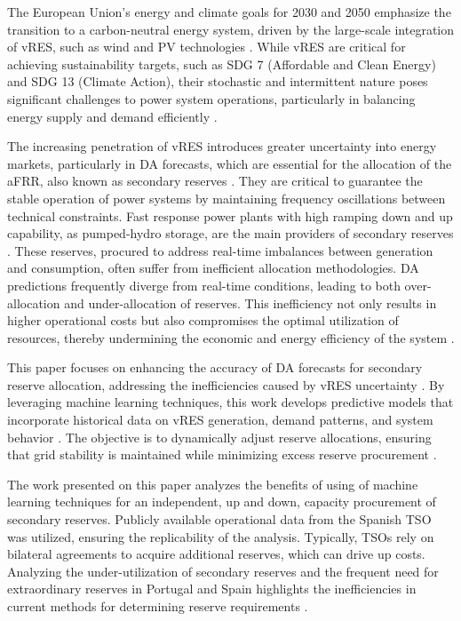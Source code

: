 The European Union's energy and climate goals for 2030 and 2050 emphasize the transition to a carbon-neutral energy system, driven by the large-scale integration of \gls{vRES}, such as wind and \gls{PV} technologies \cite{Franc:21,Perissi2022,Dobrowolski:22}. While \gls{vRES} are critical for achieving sustainability targets, such as \gls{SDG} 7 (Affordable and Clean Energy) and \gls{SDG} 13 (Climate Action), their stochastic and intermittent nature poses significant challenges to power system operations, particularly in balancing energy supply and demand efficiently \cite{Ocker2017,Frade2019_wind}.  \par
The increasing penetration of \gls{vRES} introduces greater uncertainty into energy markets, particularly in \gls{DA} forecasts, which are essential for the allocation of the \gls{aFRR}, also known as secondary reserves \cite{Algarvio:19c,Skytte:19}. They are critical to guarantee the stable operation of power systems by maintaining frequency oscillations between technical constraints. Fast response power plants with high ramping down and up capability, as pumped-hydro storage, are the main providers of secondary reserves \cite{Algarvio:20}. These reserves, procured to address real-time imbalances between generation and consumption, often suffer from inefficient allocation methodologies. \gls{DA} predictions frequently diverge from real-time conditions, leading to both over-allocation and under-allocation of reserves. This inefficiency not only results in higher operational costs but also compromises the optimal utilization of resources, thereby undermining the economic and energy efficiency of the system \cite{Algarvio:24,Frade:19c}.\par
This paper focuses on enhancing the accuracy of \gls{DA} forecasts for secondary reserve allocation, addressing the inefficiencies caused by \gls{vRES} uncertainty \cite{Algarvio:19b,Knorr:19}. By leveraging machine learning techniques, this work develops predictive models that incorporate historical data on \gls{vRES} generation, demand patterns, and system behavior \cite{DeVos2019,Kruse2022} . The objective is to dynamically adjust reserve allocations, ensuring that grid stability is maintained while minimizing excess reserve procurement \cite{Algarvio:24,Algarvio2024}.\par
The work presented on this paper analyzes the benefits of using of machine learning techniques for an independent, up and down, capacity procurement of secondary reserves. Publicly available operational data from the Spanish \gls{TSO} was utilized, ensuring the replicability of the analysis. Typically, \gls{TSO}s rely on bilateral agreements to acquire additional reserves, which can drive up costs. Analyzing the under-utilization of secondary reserves and the frequent need for extraordinary reserves in Portugal and Spain highlights the inefficiencies in current methods for determining reserve requirements \cite{Frade:19c,Algarvio2024,Algarvio:24,Martin:18}. \par
